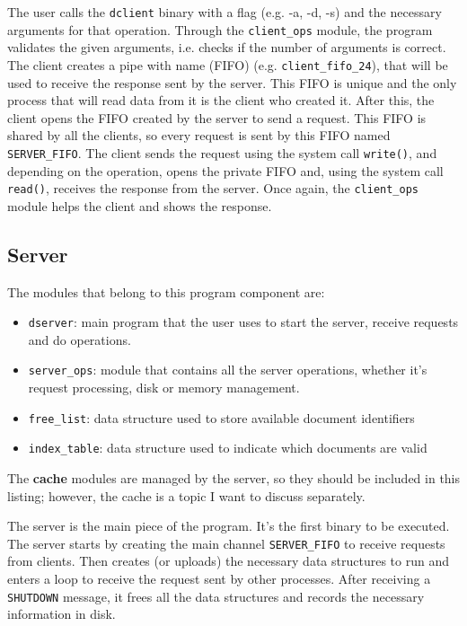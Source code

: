 \documentclass[a4paper, 11pt]{article}
\begin{document}
\noindent The user calls the \texttt{dclient} binary with a flag (e.g. -a, -d, -s) and the necessary arguments for that operation. Through the \texttt{client\_ops} module, the program validates the given arguments, i.e. checks if the number of arguments is correct. The client creates a pipe with name (FIFO) (e.g. \texttt{client\_fifo\_24}), that will be used to receive the response sent by the server. This FIFO is unique and the only process that will read data from it is the client who created it. After this, the client opens the FIFO created by the server to send a request. This FIFO is shared by all the clients, so every request is sent by this FIFO named \texttt{SERVER\_FIFO}. The client sends the request using the system call \texttt{write()}, and depending on the operation, opens the private FIFO and, using the system call \texttt{read()}, receives the response from the server. Once again, the \texttt{client\_ops} module helps the client and shows the response.


\subsection{Server}

The modules that belong to this program component are:

\begin{itemize}
    \item \texttt{dserver}: main program that the user uses to start the server, receive requests and do operations.
    \item \texttt{server\_ops}: module that contains all the server operations, whether it's request processing, disk or memory management.
    \item \texttt{free\_list}: data structure used to store available document identifiers
    \item \texttt{index\_table}: data structure used to indicate which documents are valid
\end{itemize}

\noindent The \textbf{cache} modules are managed by the server, so they should be included in this listing; however, the cache is a topic I want to discuss separately.

\noindent The server is the main piece of the program. It's the first binary to be executed. The server starts by creating the main channel \texttt{SERVER\_FIFO} to receive requests from clients. Then creates (or uploads) the necessary data structures to run and enters a loop to receive the request sent by other processes. After receiving a \texttt{SHUTDOWN} message, it frees all the data structures and records the necessary information in disk.
\end{document}
